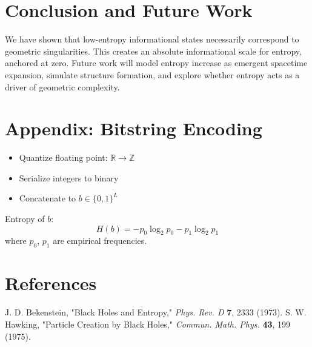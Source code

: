 \documentclass[11pt]{article}
\begin{document}
\section{Conclusion and Future Work}

We have shown that low-entropy informational states necessarily correspond to geometric singularities. This creates an absolute informational scale for entropy, anchored at zero. Future work will model entropy increase as emergent spacetime expansion, simulate structure formation, and explore whether entropy acts as a driver of geometric complexity.

\appendix
\section{Appendix: Bitstring Encoding}

\begin{itemize}
  \item Quantize floating point: $\mathbb{R} \to \mathbb{Z}$
  \item Serialize integers to binary
  \item Concatenate to $b \in \{0,1\}^L$
\end{itemize}

Entropy of $b$:
\[
  H(b) = -p_0 \log_2 p_0 - p_1 \log_2 p_1
\]
where $p_0$, $p_1$ are empirical frequencies.

\section*{References}
\begin{thebibliography}{9}
   J. D. Bekenstein, "Black Holes and Entropy," \textit{Phys. Rev. D} \textbf{7}, 2333 (1973).
   S. W. Hawking, "Particle Creation by Black Holes," \textit{Commun. Math. Phys.} \textbf{43}, 199 (1975).
\end{thebibliography}
\end{document}
